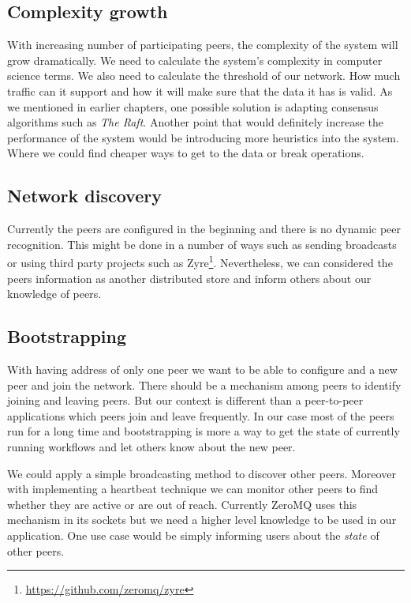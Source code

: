 \subsection{Complexity growth}
With increasing number of participating peers, the complexity of the system will grow dramatically. 
We need to calculate the system's complexity in computer science terms.
We also need to calculate the threshold of our network.
How much traffic can it support and how it will make sure that the data it has is valid.
As we mentioned in earlier chapters, one possible solution is adapting consensus algorithms such
as \textit{The Raft}. Another point that would definitely increase the performance of the system
would be introducing more heuristics into the system. Where we could find cheaper ways
to get to the data or break operations.


\subsection{Network discovery}
Currently the peers are configured in the beginning and there is no dynamic peer recognition. This might be done in a number of ways
such as sending broadcasts or using third party projects such as Zyre\footnote{\url{https://github.com/zeromq/zyre}}.
Nevertheless, we can considered the peers information as another distributed store and inform others about our knowledge of peers.

\subsection{Bootstrapping}
With having address of only one peer we want to be able to configure and a new peer and join the network. There should be a mechanism among
peers to identify joining and leaving peers. But our context is different than a peer-to-peer applications which peers join and leave 
frequently. In our case most of the peers run for a long time and bootstrapping is more a way to get the state of currently running workflows and
let others know about the new peer.

We could apply a simple broadcasting method to discover other peers. Moreover with implementing a heartbeat technique we can
monitor other peers to find whether they are active or are out of reach. Currently ZeroMQ uses this mechanism in its sockets but
we need a higher level knowledge to be used in our application. One use case would be simply informing users about the \textit{state}
of other peers.

